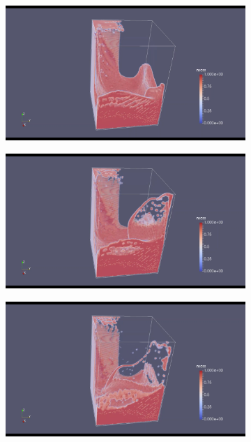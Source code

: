 \documentclass[10pt,a4paper,notitlepage]{article}
\begin{document}
\begin{figure}[H]
\begin{subfigure}{0.25\textwidth}
\end{subfigure}
\centering
\begin{subfigure}{0.25\textwidth}
  \includegraphics[width=1.0\linewidth]{dam/4.png}
\end{subfigure}%
\begin{subfigure}{0.25\textwidth}
  \includegraphics[width=1.0\linewidth]{dam/5.png}
\end{subfigure}
\begin{subfigure}{0.25\textwidth}
  \includegraphics[width=1.0\linewidth]{dam/6.png}

\end{subfigure}
\end{figure}
\end{document}
